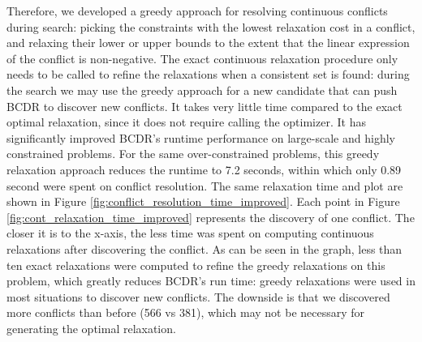 \documentclass[jair,twoside,11pt,theapa]{article}
\begin{document}
Therefore, we developed a greedy approach for resolving continuous conflicts during search:
picking the constraints with the lowest relaxation cost in a conflict, and
relaxing their lower or upper bounds to the extent that the linear expression of
the conflict is non-negative. The exact continuous relaxation procedure only
needs to be called to refine the relaxations when a consistent set is found:
during the search we may use the greedy approach for a new candidate that can
push BCDR to discover new conflicts. It takes very little time compared to the
exact optimal relaxation, since it does not require calling the optimizer. It
has significantly improved BCDR's runtime performance on large-scale and highly
constrained problems. For the same over-constrained problems, this greedy
relaxation approach reduces the runtime to 7.2 seconds, within which only 0.89
second were spent on conflict resolution. The same relaxation time and plot are
shown in Figure \ref{fig:conflict_resolution_time_improved}. Each point in
Figure \ref{fig:cont_relaxation_time_improved} represents the discovery of one
conflict. The closer it is to the x-axis, the less time was spent on computing
continuous relaxations after discovering the conflict. As can be seen in the
graph, less than ten exact relaxations were computed to refine the greedy
relaxations on this problem, which greatly reduces BCDR's run time: greedy
relaxations were used in most situations to discover new conflicts. The
downside is that we discovered more conflicts than before (566 vs 381), which
may not be necessary for generating the optimal relaxation.
\end{document}

